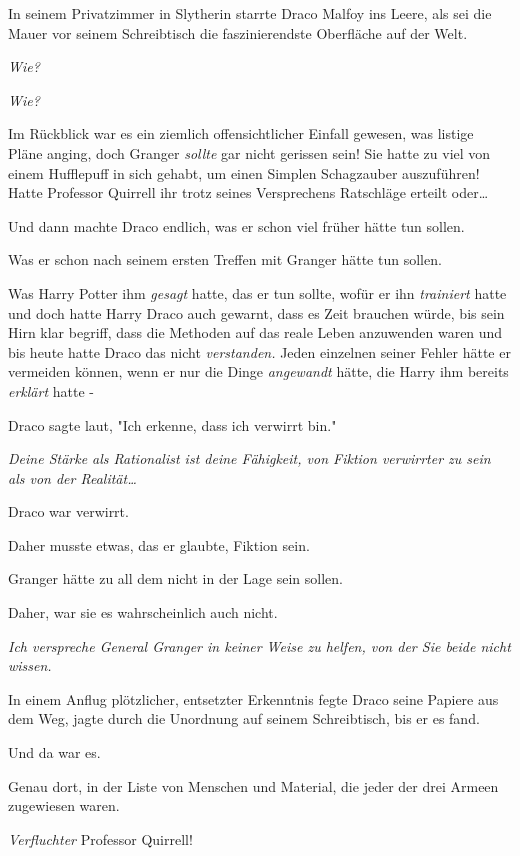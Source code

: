 {\later

In seinem Privatzimmer in Slytherin starrte Draco Malfoy ins Leere, als sei die Mauer vor seinem Schreibtisch die faszinierendste Oberfläche auf der Welt.

\emph{Wie?}

\emph{Wie?}

Im Rückblick war es ein ziemlich offensichtlicher Einfall gewesen, was listige Pläne anging, doch Granger \emph{sollte} gar nicht gerissen sein! Sie hatte zu viel von einem Hufflepuff in sich gehabt, um einen Simplen Schagzauber auszuführen! Hatte Professor Quirrell ihr trotz seines Versprechens Ratschläge erteilt oder…

Und dann machte Draco endlich, was er schon viel früher hätte tun sollen.

Was er schon nach seinem ersten Treffen mit Granger hätte tun sollen.

Was Harry Potter ihm \emph{gesagt} hatte, das er tun sollte, wofür er ihn \emph{trainiert} hatte und doch hatte Harry Draco auch gewarnt, dass es Zeit brauchen würde, bis sein Hirn klar begriff, dass die Methoden auf das reale Leben anzuwenden waren und bis heute hatte Draco das nicht \emph{verstanden.} Jeden einzelnen seiner Fehler hätte er vermeiden können, wenn er nur die Dinge \emph{angewandt} hätte, die Harry ihm bereits \emph{erklärt} hatte -

Draco sagte laut, "Ich erkenne, dass ich verwirrt bin."

\emph{Deine Stärke als Rationalist ist deine Fähigkeit, von Fiktion verwirrter zu sein als von der Realität…}

Draco war verwirrt.

Daher musste etwas, das er glaubte, Fiktion sein.

Granger hätte zu all dem nicht in der Lage sein sollen.

Daher, war sie es wahrscheinlich auch nicht.

\emph{Ich verspreche General Granger in keiner Weise zu helfen, von der Sie beide nicht wissen.}

In einem Anflug plötzlicher, entsetzter Erkenntnis fegte Draco seine Papiere aus dem Weg, jagte durch die Unordnung auf seinem Schreibtisch, bis er es fand.

Und da war es.

Genau dort, in der Liste von Menschen und Material, die jeder der drei Armeen zugewiesen waren.

\emph{Verfluchter} Professor Quirrell!

}
